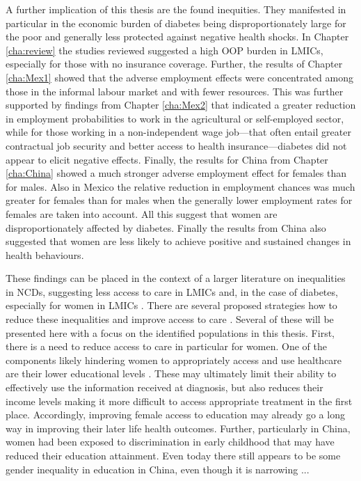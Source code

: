 A further implication of this thesis are the found inequities. They manifested in particular in the economic burden of diabetes being disproportionately large for the poor and generally less protected against negative health shocks. In Chapter \ref{cha:review} the studies reviewed suggested a high \ac{OOP} burden in \acp{LMIC}, especially for those with no insurance coverage. Further, the results of Chapter \ref{cha:Mex1} showed that the adverse employment effects were concentrated among those in the informal labour market and with fewer resources. This was further supported by findings from Chapter \ref{cha:Mex2} that indicated a greater reduction in employment probabilities to work in the agricultural or self-employed sector, while for those working in a non-independent wage job---that often entail greater contractual job security and better access to health insurance---diabetes did not appear to elicit negative effects. Finally, the results for China from Chapter \ref{cha:China} showed a much stronger adverse employment effect for females than for males. Also in Mexico the relative reduction in employment chances was much greater for females than for males when the generally lower employment rates for females are taken into account. All this suggest that women are disproportionately affected by diabetes. Finally the results from China also suggested that women are less likely to achieve positive and sustained changes in health behaviours.

These findings can be placed in the context of a larger literature on inequalities in \acp{NCD}, suggesting less access to care in \acp{LMIC} and, in the case of diabetes, especially for women in \acp{LMIC} \parencite{DiCesare2013}. There are several proposed strategies how to reduce these inequalities and improve access to care \parencite{Jacobs2012}. Several of these will be presented here with a focus on the identified populations in this thesis. First, there is a need to reduce access to care in particular for women. One of the components likely hindering women to appropriately  access and use healthcare are their lower educational levels \parencite{Jacobs2012}. These may ultimately limit their ability to effectively use the information received at diagnosis, but also reduces their income levels making it more difficult to access appropriate treatment in the first place. Accordingly, improving female access to education may already go a long way in improving their later life health outcomes. Further, particularly in China, women had been exposed to discrimination in early childhood that may have reduced their education attainment. Even today there still appears to be some gender inequality in education in China, even though it is narrowing \parencite{Zeng2014}...


